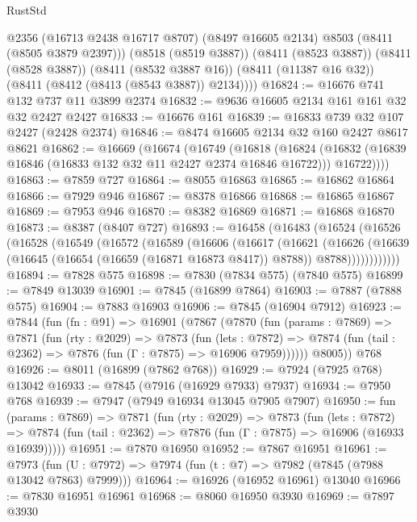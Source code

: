 \begin{lexlean}{RustStd}
\begin{coremodule}
          @2356
          (@16713 @2438 @16717 @8707)
          (@8497 @16605 @2134)
          @8503
          (@8411 (@8505 @3879 @2397)))
        (@8518 (@8519 @3887))
        (@8411 (@8523 @3887))
        (@8411 (@8528 @3887))
        (@8411 (@8532 @3887 @16))
        (@8411 (@11387 @16 @32))
        (@8411 (@8412 (@8413 (@8543 @3887)) @2134))))
@16824 := @16676 @741 @132 @737 @11 @3899 @2374
@16832 := @9636 @16605 @2134 @161 @161 @32 @32 @2427 @2427
@16833 := @16676 @161
@16839 := @16833 @739 @32 @107 @2427 (@2428 @2374)
@16846 := @8474 @16605 @2134 @32 @160 @2427 @8617 @8621
@16862 := @16669
    (@16674
      (@16749
        (@16818
          (@16824
            (@16832 (@16839 @16846 (@16833 @132 @32 @11 @2427 @2374 @16846 @16722)))
            @16722))))
@16863 := @7859 @727
@16864 := @8055 @16863
@16865 := @16862 @16864
@16866 := @7929 @946
@16867 := @8378 @16866
@16868 := @16865 @16867
@16869 := @7953 @946
@16870 := @8382 @16869
@16871 := @16868 @16870
@16873 := @8387 (@8407 @727)
@16893 := @16458
    (@16483
      (@16524
        (@16526
          (@16528
            (@16549
              (@16572
                (@16589
                  (@16606
                    (@16617
                      (@16621
                        (@16626
                          (@16639
                            (@16645 (@16654 (@16659 (@16871 @16873 @8417)) @8788))
                            @8788))))))))))))
@16894 := @7828 @575
@16898 := @7830 (@7834 @575) (@7840 @575)
@16899 := @7849 @13039
@16901 := @7845 (@16899 @7864)
@16903 := @7887 (@7888 @575)
@16904 := @7883 @16903
@16906 := @7845 (@16904 @7912)
@16923 := @7844
    (fun (fn : @91) =>
    @16901
      (@7867
        (@7870
          (fun (params : @7869) =>
          @7871
            (fun (rty : @2029) =>
            @7873
              (fun (lets : @7872) =>
              @7874 (fun (tail : @2362) => @7876 (fun (Γ : @7875) => @16906 @7959))))))
        @8005))
    @768
@16926 := @8011 (@16899 (@7862 @768))
@16929 := @7924 (@7925 @768) @13042
@16933 := @7845 (@7916 (@16929 @7933) @7937)
@16934 := @7950 @768
@16939 := @7947 (@7949 @16934 @13045 @7905 @7907)
@16950 := fun (params : @7869) =>
  @7871
    (fun (rty : @2029) =>
    @7873
      (fun (lets : @7872) =>
      @7874 (fun (tail : @2362) => @7876 (fun (Γ : @7875) => @16906 (@16933 @16939)))))
@16951 := @7870 @16950
@16952 := @7867 @16951
@16961 := @7973
    (fun (U : @7972) => @7974 (fun (t : @7) => @7982 (@7845 (@7988 @13042 @7863) @7999)))
@16964 := @16926 (@16952 @16961) @13040
@16966 := @7830 @16951 @16961
@16968 := @8060 @16950 @3930
@16969 := @7897 @3930

\end{coremodule}
\end{lexlean}
